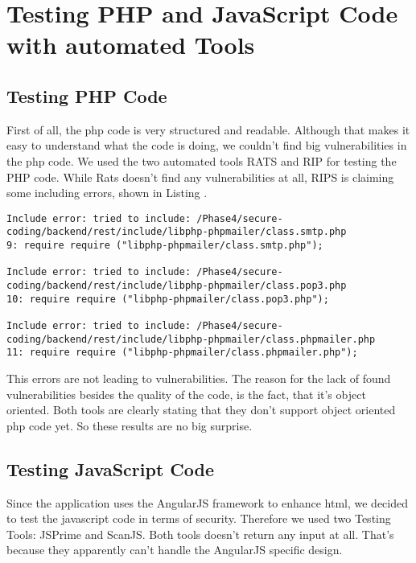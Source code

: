 \chapter{Testing PHP and JavaScript Code with automated Tools}

\section{Testing PHP Code}

First of all, the php code is very structured and readable. Although that makes it easy to understand what the code is doing, we couldn't find big vulnerabilities in the php code.
We used  the two automated tools RATS and RIP for testing the PHP code. While Rats doesn't find any vulnerabilities at all, RIPS is claiming some including errors, shown in Listing .
\begin{lstlisting}[caption= Output of automated testing tool RIPS]
Include error: tried to include: /Phase4/secure-coding/backend/rest/include/libphp-phpmailer/class.smtp.php
9: require require ("libphp-phpmailer/class.smtp.php"); 

Include error: tried to include: /Phase4/secure-coding/backend/rest/include/libphp-phpmailer/class.pop3.php
10: require require ("libphp-phpmailer/class.pop3.php"); 

Include error: tried to include: /Phase4/secure-coding/backend/rest/include/libphp-phpmailer/class.phpmailer.php
11: require require ("libphp-phpmailer/class.phpmailer.php"); 
\end{lstlisting}
This errors are not leading to vulnerabilities. The reason for the lack of found vulnerabilities besides the quality of the code, is the fact, that it's object oriented. Both tools are clearly stating that they don't support object oriented php code yet. So these results are no big surprise.

\section{Testing JavaScript Code}
Since the application uses  the AngularJS framework to enhance html, we decided to test the javascript code in terms of security. Therefore we used two Testing Tools: JSPrime and ScanJS. Both tools doesn't return any input at all. That's because they  apparently can't handle the AngularJS specific design.  




 